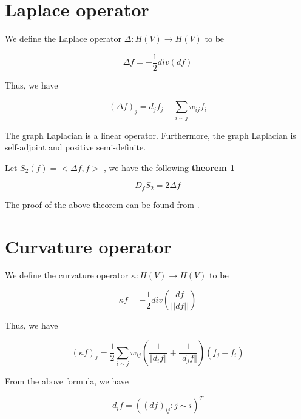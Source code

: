 \section{Laplace operator}

We define the Laplace operator  \(  \Delta :H \left( V \right)  \rightarrow H \left( V \right)  \)  to be


\begin{equation}
\Delta f=-\frac{1}{2}div \left( df \right)
\end{equation}


Thus, we have 


\begin{equation}
\left(  \Delta f \right) _{j}=d_{j}f_{j}- \sum _{i \sim j}^{}w_{ij}f_{i}
\end{equation}


The graph Laplacian is a linear operator. Furthermore, the graph Laplacian is self-adjoint and positive semi-definite. 

Let  \( S_{2} \left( f \right) =< \Delta f,f> \) , we have the following \textbf{theorem 1}


\begin{equation}
D_{f}S_{2}=2 \Delta f
\end{equation}


The proof of the above theorem can be found from \citep{tran2015normalized, tran2017normalized}.


\section{Curvature operator}

We define the curvature operator  \(  \kappa :H \left( V \right)  \rightarrow H \left( V \right)  \)  to be


\begin{equation}
\kappa f=-\frac{1}{2}div \left( \frac{df}{ \vert  \vert df \vert  \vert } \right)
\end{equation}


Thus, we have


\begin{equation}
\label{eq:kf_j}
\left(  \kappa f \right) _{j}=\frac{1}{2} \sum _{i \sim j}^{}w_{ij} \left( \frac{1}{ \Vert d_{i}f \Vert }+\frac{1}{ \Vert d_{j}f \Vert } \right)  \left( f_{j}-f_{i} \right)
\end{equation}


From the above formula, we have


\begin{equation}
d_{i}f= \left(  \left( df \right) _{ij}:j \sim i \right) ^{T}
\end{equation}


